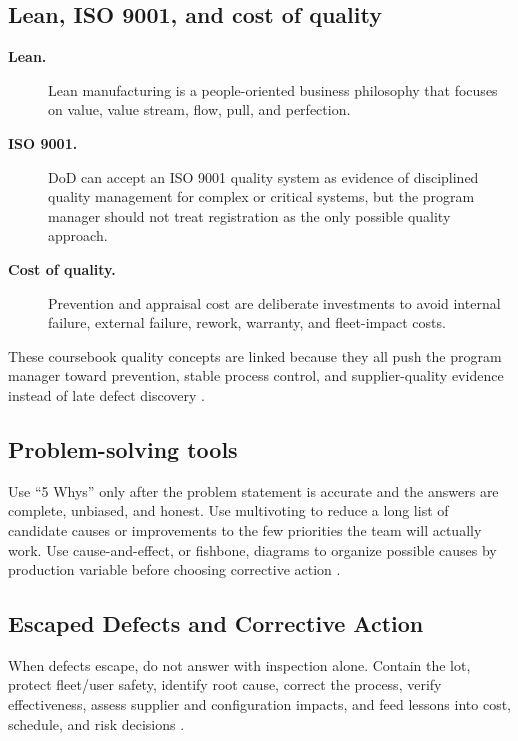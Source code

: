 \documentclass[../main.tex]{subfiles}
\begin{document}
\subsection{Lean, ISO 9001, and cost of quality}

\begin{description}
  \item[\textbf{Lean.}] Lean manufacturing is a people-oriented business philosophy that focuses on value, value stream, flow, pull, and perfection.
  \item[\textbf{ISO 9001.}] DoD can accept an ISO 9001 quality system as evidence of disciplined quality management for complex or critical systems, but the program manager should not treat registration as the only possible quality approach.
  \item[\textbf{Cost of quality.}] Prevention and appraisal cost are deliberate investments to avoid internal failure, external failure, rework, warranty, and fleet-impact costs.
\end{description}
These coursebook quality concepts are linked because they all push the program
manager toward prevention, stable process control, and supplier-quality evidence
instead of late defect discovery
\autocite{edo-3-7-2-production-quality-manufacturing-2026}.

\subsection{Problem-solving tools}

Use ``5 Whys'' only after the problem statement is accurate and the answers are
complete, unbiased, and honest.  Use multivoting to reduce a long list of
candidate causes or improvements to the few priorities the team will actually
work.  Use cause-and-effect, or fishbone, diagrams to organize possible causes
by production variable before choosing corrective action
\autocite{edo-3-7-2-production-quality-manufacturing-2026}.

\subsection{Escaped Defects and Corrective Action}

When defects escape, do not answer with inspection alone.  Contain the lot,
protect fleet/user safety, identify root cause, correct the process, verify
effectiveness, assess supplier and configuration impacts, and feed lessons into
cost, schedule, and risk decisions
\autocite{edo-3-7-2-production-quality-manufacturing-2026,DoD-Producibility-Manufacturability-Guide-2024,DAU-Manufacturing-Quality}.
\end{document}
